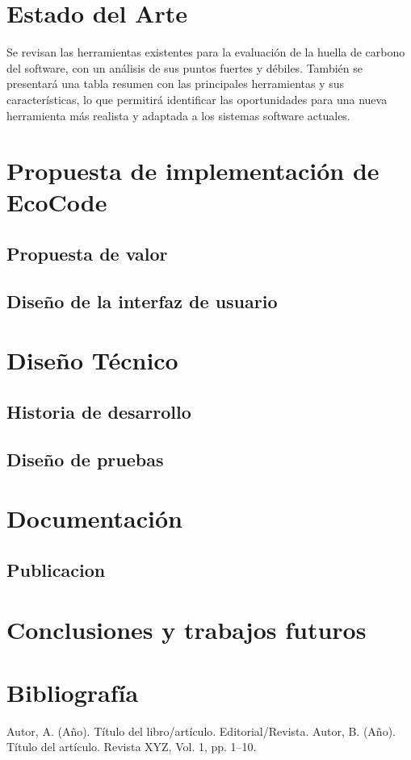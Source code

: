 \documentclass[12pt,a4paper]{report}
\begin{document}
\chapter{Estado del Arte}

Se revisan las herramientas existentes para la evaluación de la huella de carbono del software, con un análisis de sus puntos fuertes y débiles. También se presentará una tabla resumen con las principales herramientas y sus características, lo que permitirá identificar las oportunidades para una nueva herramienta más realista y adaptada a los sistemas software actuales.

\chapter{Propuesta de implementación de EcoCode}

\section{Propuesta de valor}

\section{Diseño de la interfaz de usuario}

\chapter{Diseño Técnico}

\section{Historia de desarrollo}

\section{Diseño de pruebas}

\chapter{Documentación}

\section{Publicacion}

\chapter{Conclusiones y trabajos futuros}

\chapter*{Bibliografía}
\begin{thebibliography}{99}
     Autor, A. (Año). Título del libro/artículo. Editorial/Revista.
     Autor, B. (Año). Título del artículo. Revista XYZ, Vol. 1, pp. 1--10.
\end{thebibliography}
\end{document}
